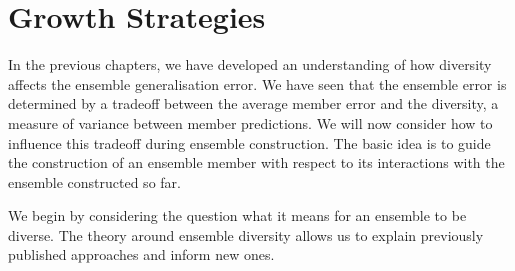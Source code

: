 \documentclass[
	twoside=false, %
]{kaobook}
\begin{document}








\chapter{Growth Strategies}




In the previous chapters, we have developed an understanding of how diversity affects the ensemble generalisation error. We have seen that the ensemble error is determined by a tradeoff between the average member error and the diversity, a measure of variance between member predictions. We will now consider how to influence this tradeoff during ensemble construction. The basic idea is to guide the construction of an ensemble member with respect to its interactions with the ensemble constructed so far.

We begin by considering the question what it means for an ensemble to be diverse. 
The theory around ensemble diversity allows us to explain previously published approaches and inform new ones. 



\end{document}
